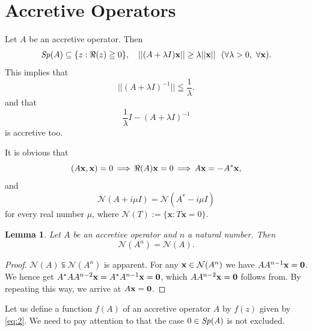 \documentclass[reqno]{amsart}
\newtheorem{lemma}[theorem]{Lemma}
\theoremstyle{definition}
\theoremstyle{remark}
\begin{document}
\section{Accretive Operators}
Let $A$ be an accretive operator. Then 
$${\it Sp}(A)\subseteq \{z: \Re(z)\geqq 0\}, \quad  
||(A+ \lambda I)\mathbf{x}||\geq \lambda ||\mathbf{x}|| \,\,\,\, (\forall\lambda > 0, \,\, \forall\mathbf{x}).$$
 This implies that
\begin{equation}
 ||(A + \lambda I)^{-1}||\leqq \frac{1}{\lambda}. 
\label{eq:5}
\end{equation} and that   
$$\frac{1}{\lambda}I - (A + \lambda I)^{-1}$$
 is accretive too. \par
It is obvious that 
$$( A {\bf x}, {\bf x}) = 0\, \Longrightarrow \, \Re(A){\bf x} = 0\,  \Longrightarrow \,A{\bf x}= - A^*{\bf x},
$$ and  
$$\mathcal{N}(A + i \mu I) = \mathcal{N}( A^* - i\mu I)$$
for every real number $\mu$, where  
$\mathcal{N}(T):= \{\mathbf{x}: T \mathbf{x} = 0\}$. 
\begin{lemma}\label{Lem:3-1}
Let $A$ be an accretive operator and $n$ a natural number. Then 
$$\mathcal{N}(A^n) = \mathcal{N}(A).$$
\end{lemma}
\begin{proof}  $\mathcal{N}(A) \subseteqq \mathcal{N}(A^n)$ is apparent. 
For any ${\bf x} \in \mathcal{N}(A^n)$ we have $A A^{n-1} {\bf x} = {\bf 0}$. We hence 
get $A^* A A^{n-2} {\bf x} = A^* A^{n-1} {\bf x} = {\bf 0}$, which 
$A A^{n-2} {\bf x} = {\bf 0}$ follows from. By repeating this way, we arrive at  
$A {\bf x} = {\bf 0}$.
\end{proof}
Let us define a function $f(A)$ of an accretive operator $A$ by $f(z)$ given by \eqref{eq:2}. We need to 
pay attention to that the case $0\in \it{Sp}(A)$ 
is not excluded. 
\end{document}
